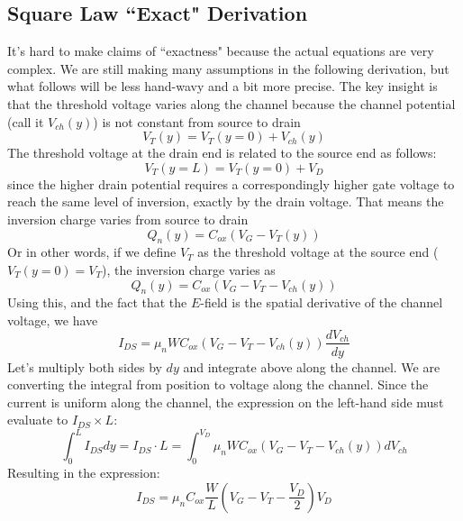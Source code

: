 \subsection{Square Law ``Exact" Derivation}
It's hard to make claims of ``exactness" because the actual equations are very complex.  We are still making many assumptions in the following derivation, but what follows will be less hand-wavy and a bit more precise.  The key insight is that the threshold voltage varies along the channel because the channel potential (call it $V_{ch}(y)$) is not constant from source to drain
    \begin{equation} 
        V_T(y) = V_T(y= 0 ) + V_{ch}(y) 
    \end{equation}
The threshold voltage at the drain end is related to the source end as follows:
    \begin{equation} 
        V_T(y=L) = V_T(y = 0) + V_D 
    \end{equation} 
since the higher drain potential requires a correspondingly higher gate voltage to reach the same level of inversion, exactly by the drain voltage.  That means the inversion charge varies from source to drain
    \begin{equation} 
        Q_n(y) = C_{ox} (V_G - V_T(y)) 
    \end{equation}
Or in other words, if we define $V_T$ as the threshold voltage at the source end ($V_T(y=0) = V_{T}$), the inversion charge varies as
    \begin{equation} 
        Q_n(y) = C_{ox} (V_G - V_T - V_{ch}(y) )  \label{eq:invcharge}
    \end{equation}
Using this, and the fact that the $E$-field is the spatial derivative of the channel voltage, we have
    \begin{equation} 
        I_{DS} = \mu_n W C_{ox} \left(V_G - V_T - V_{ch}(y) \right) \frac{dV_{ch}}{dy} 
    \end{equation}
Let's multiply both sides by $dy$ and integrate above along the channel.  We are converting the integral from position to voltage along the channel.  Since the current is uniform along the channel, the expression on the left-hand side must evaluate to $I_{DS} \times L$:
    \begin{equation} 
        \int_0^L I_{DS} dy = I_{DS} \cdot L = \int_0^{V_D} \mu_n W C_{ox} (V_G - V_T - V_{ch}(y)) dV_{ch} 
    \end{equation}
Resulting in the expression:
    \begin{equation} 
        I_{DS} = \mu_n C_{ox} \frac{W}{L} \left( V_G - V_T - \frac{V_D}{2} \right) V_D 
    \end{equation}
